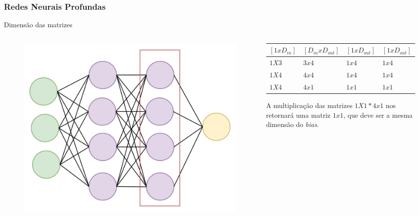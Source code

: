 \documentclass{beamer}
\begin{document}
\begin{frame}
	\frametitle{Redes Neurais Profundas}
	\begin{block}{Dimensão das matrizes}
		\begin{columns}
			\begin{column}{0.4\textwidth}
				\begin{figure}
					\centering
					\includegraphics[width=1\linewidth]{figures/simple_nn3}
				\end{figure}
			\end{column}
			\begin{column}{0.6\textwidth}
				\begin{table}[]
					\begin{tabular}{|l|l|l|l|}
						\hline
						$[1 x D_{in}]$ & $[D_{in} x D_{out}]$ &  $[1x D_{out}]$ & $ [1x D_{out}]$ \\ \hline
						$1X3$ & $3x4$ &  $1x4$ & $1x4$  \\ \hline
						$1X4$ & $4x4$ &  $1x4$ & $1x4$  \\ \hline
						$1X4$ & $4x1$ &  $1x1$ & $1x1$  \\ \hline
					\end{tabular}
				\end{table}
				A multiplicação das matrizes $1X1 * 4x1$ nos retornará uma matriz $1x1$, que deve ser a mesma dimensão do \textit{bias}.
			\end{column}
		\end{columns}
		
	\end{block}
\end{frame}
\end{document}

